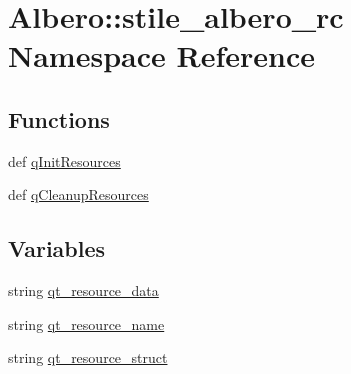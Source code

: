 \hypertarget{namespaceAlbero_1_1stile__albero__rc}{
\section{Albero::stile\_\-albero\_\-rc Namespace Reference}
\label{namespaceAlbero_1_1stile__albero__rc}
}
\subsection*{Functions}
\begin{DoxyCompactItemize}
\item 
def \hyperlink{namespaceAlbero_1_1stile__albero__rc_a7cea1a77295df9f1bed11b601778009b}{qInitResources}
\item 
def \hyperlink{namespaceAlbero_1_1stile__albero__rc_aceb42215c19577f0ebc173df75969400}{qCleanupResources}
\end{DoxyCompactItemize}
\subsection*{Variables}
\begin{DoxyCompactItemize}
\item 
string \hyperlink{namespaceAlbero_1_1stile__albero__rc_ac54f331156bbcd4a77eb771964b081a0}{qt\_\-resource\_\-data}
\item 
string \hyperlink{namespaceAlbero_1_1stile__albero__rc_a17d6fbe19c7ec61ff872f2688ca957f2}{qt\_\-resource\_\-name}
\item 
string \hyperlink{namespaceAlbero_1_1stile__albero__rc_a47cf969fa3c5f71007adb2af87362eec}{qt\_\-resource\_\-struct}
\end{DoxyCompactItemize}


